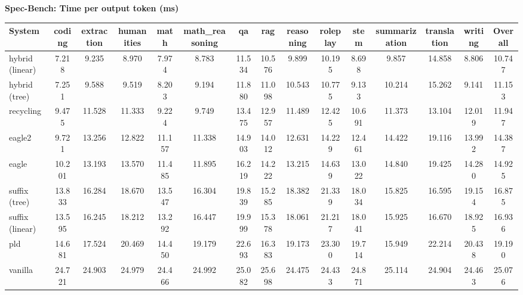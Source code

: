 \textbf{Spec-Bench: Time per output token (ms)}
\begin{table}[H]
\begin{adjustbox}{width=\linewidth}
\centering
\begin{tabular}{lcccccccccccccc}
\toprule
\textbf{System} & coding & extraction & humanities & math & math\_reasoning & qa & rag & reasoning & roleplay & stem & summarization & translation & writing & \textbf{Overall} \\
\midrule
hybrid (linear) & 7.218 & 9.235 & 8.970 & 7.974 & 8.783 & 11.534 & 10.576 & 9.899 & 10.195 & 8.698 & 9.857 & 14.858 & 8.806 & 10.747 \\
hybrid (tree) & 7.251 & 9.588 & 9.519 & 8.203 & 9.194 & 11.880 & 11.098 & 10.543 & 10.775 & 9.133 & 10.214 & 15.262 & 9.141 & 11.153 \\
recycling & 9.475 & 11.528 & 11.333 & 9.224 & 9.749 & 13.475 & 12.957 & 11.489 & 12.425 & 10.691 & 11.373 & 13.104 & 12.019 & 11.947 \\
eagle2 & 9.721 & 13.256 & 12.822 & 11.157 & 11.338 & 14.903 & 14.012 & 12.631 & 14.229 & 12.461 & 14.422 & 19.116 & 13.992 & 14.387 \\
eagle & 10.201 & 13.193 & 13.570 & 11.485 & 11.895 & 16.219 & 14.222 & 13.215 & 14.639 & 13.022 & 14.840 & 19.425 & 14.280 & 14.925 \\
suffix (tree) & 13.833 & 16.284 & 18.670 & 13.547 & 16.304 & 19.839 & 15.285 & 18.382 & 21.339 & 18.034 & 15.825 & 16.595 & 19.154 & 16.875 \\
suffix (linear) & 13.595 & 16.245 & 18.212 & 13.292 & 16.447 & 19.999 & 15.378 & 18.061 & 21.217 & 18.041 & 15.925 & 16.670 & 18.925 & 16.936 \\
pld & 14.681 & 17.524 & 20.469 & 14.450 & 19.179 & 22.693 & 16.383 & 19.173 & 23.300 & 19.714 & 15.949 & 22.214 & 20.438 & 19.190 \\
vanilla & 24.721 & 24.903 & 24.979 & 24.466 & 24.992 & 25.082 & 25.698 & 24.475 & 24.433 & 24.871 & 25.114 & 24.904 & 24.463 & 25.076 \\
\bottomrule
\end{tabular}
\end{adjustbox}
\end{table}

